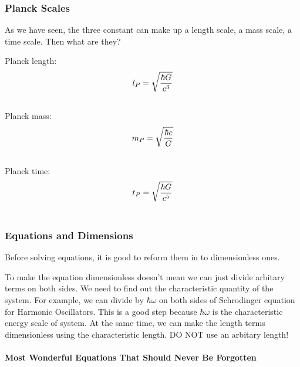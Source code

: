 \documentclass[letterpaper,10pt,english]{sphinxmanual}
\begin{document}
\subsubsection{Planck Scales}
\label{Basic:planck-scales}
As we have seen, the three constant can make up a length scale, a mass scale, a time scale. Then what are they?

Planck length:
\begin{gather}
\begin{split}l_P = \sqrt{ \frac{ \hbar G }{ c^3 } }\end{split}\notag\\\begin{split}\end{split}\notag
\end{gather}
Planck mass:
\begin{gather}
\begin{split}m_P = \sqrt{ \frac{ \hbar c }{ G } }\end{split}\notag\\\begin{split}\end{split}\notag
\end{gather}
Planck time:
\begin{gather}
\begin{split}t_P = \sqrt{ \frac{\hbar G}{ c^5 } }\end{split}\notag\\\begin{split}\end{split}\notag
\end{gather}

\subsubsection{Equations and Dimensions}
\label{Basic:equations-and-dimensions}
Before solving equations, it is good to reform them in to dimensionless ones.

To make the equation dimensionless doesn't mean we can just divide arbitary terms on both sides. We need to find out the characteristic quantity of the system. For example, we can divide by $\hbar\omega$ on both sides of Schrodinger equation for Harmonic Oscillators. This is a good step because $\hbar\omega$ is the characteristic energy scale of system. At the same time, we can make the length terms dimensionless using the characteristic length. DO NOT use an arbitary length!


\paragraph{Most Wonderful Equations That Should Never Be Forgotten}
\label{Basic:most-wonderful-equations-that-should-never-be-forgotten}
\end{document}
